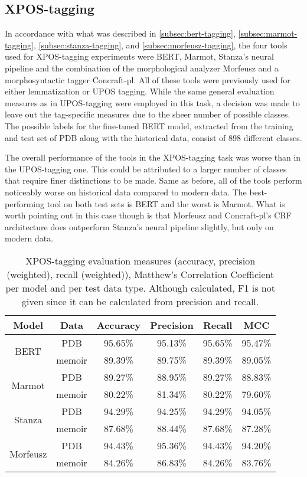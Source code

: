 \subsection{XPOS-tagging}
\label{subsec:xpos-tagging}

In accordance with what was described in \autoref{subsec:bert-tagging}, \autoref{subsec:marmot-tagging}, \autoref{subsec:stanza-tagging}, and \autoref{subsec:morfeusz-tagging}, the four tools used for XPOS-tagging experiments were BERT, Marmot, Stanza's neural pipeline and the combination of the morphological analyzer Morfeusz and a morphosyntactic tagger Concraft-pl. All of these tools were previously used for either lemmatization or UPOS tagging. While the same general evaluation measures as in UPOS-tagging were employed in this task, a decision was made to leave out the tag-specific measures due to the sheer number of possible classes. The possible labels for the fine-tuned BERT model, extracted from the training and test set of PDB along with the historical data, consist of 898 different classes. 

The overall performance of the tools in the XPOS-tagging task was worse than in the UPOS-tagging one. This could be attributed to a larger number of classes that require finer distinctions to be made. Same as before, all of the tools perform noticeably worse on historical data compared to modern data. The best-performing tool on both test sets is BERT and the worst is Marmot. What is worth pointing out in this case though is that Morfeusz and Concraft-pl's CRF architecture does outperform Stanza's neural pipeline slightly, but only on modern data.    

\renewcommand{\arraystretch}{1.25}
\begin{table}[H]
\begin{center}
\begin{tabular}{|cc|cccc|}
\hline \bf Model & \bf Data & \bf Accuracy & \bf Precision & \bf Recall & \bf MCC \\ \hline
\multirow{2}{4em}{BERT}
& PDB & 95.65\% & 95.13\% & 95.65\% & 95.47\% \\
& memoir & 89.39\% & 89.75\% & 89.39\% & 89.05\%  \\
\multirow{2}{4em}{Marmot}
& PDB & 89.27\% & 88.95\% & 89.27\% & 88.83\% \\
& memoir & 80.22\% & 81.34\% & 80.22\% & 79.60\% \\
\multirow{2}{4em}{Stanza}
& PDB & 94.29\% & 94.25\% & 94.29\% & 94.05\% \\
& memoir & 87.68\% & 88.44\% & 87.68\% & 87.28\% \\
\multirow{2}{4em}{Morfeusz}
& PDB & 94.43\% & 95.36\% & 94.43\% & 94.20\% \\
& memoir & 84.26\% & 86.83\% & 84.26\% & 83.76\% \\ 
\hline
\end{tabular}
\caption{\label{table:xpos} XPOS-tagging evaluation measures (accuracy, precision (weighted), recall (weighted)), Matthew's Correlation Coefficient per model and per test data type. Although calculated, F1 is not given since it can be calculated from precision and recall.}
\end{center}
\end{table}

